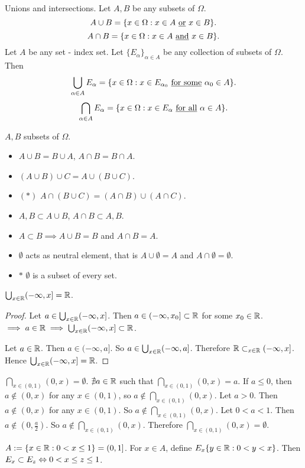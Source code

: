 \documentclass[]{article}
\begin{document}
Unions and intersections. Let $A,B$ be any subsets of $\Omega$.
$$A\cup B = \{ x\in \Omega : x\in A \text{ \underline{or} } x\in B\}.$$
$$A\cap B = \{x\in \Omega : x\in A \text{ \underline{and} } x\in B\}.$$
Let $A$ be any set - index set.
Let $\{E_\alpha\}_{\alpha\in A}$ be any collection of subsets of $\Omega$.
Then $$\bigcup_{\alpha\in A} E_\alpha = \{ x\in \Omega: x\in E_{\alpha_0} \text{ \underline{for some} } \alpha_0\in A\}.$$
$$ \bigcap_{\alpha\in A} E_\alpha = \{x\in \Omega: x\in E_\alpha \text{ \underline{for all} } \alpha\in A\}.$$
\begin{remark}
	$A,B$ subsets of $\Omega$.
	\begin{itemize}
		\item $A\cup B = B\cup A$, $A\cap B = B\cap A$.
		\item $(A\cup B)\cup C = A\cup(B\cup C)$.
		\item $(*)$ $A\cap (B\cup C) = (A\cap B)\cup (A\cap C)$.
		\item $A,B\subset A\cup B$, $A\cap B\subset A,B$.
		\item $A\subset B \implies A\cup B = B$ and $A\cap B = A$.
		\item $\emptyset$ acts as neutral element, that is $A\cup \emptyset = A$ and $A\cap \emptyset = \emptyset$.
		\item $*$ $\emptyset$ is a subset of every set.
	\end{itemize}
\end{remark}
\begin{example}
	$\bigcup_{x\in\mathbb{R}} (-\infty,x] = \mathbb{R}$.
	\begin{proof}
		\say{$\subset$} Let $a\in\bigcup_{x\in\mathbb{R}}(-\infty,x]$.
		Then $a\in(-\infty,x_0]\subset\mathbb{R}$ for some $x_0\in\mathbb{R}$.
		$\implies a\in\mathbb{R}\implies \bigcup_{x\in\mathbb{R}}(-\infty,x]\subset \mathbb{R}$.

		\say{$\supset$} Let $a\in\mathbb{R}$. Then $a\in(-\infty,a]$. So $a\in\bigcup_{x\in\mathbb{R}}(-\infty,a]$. Therefore $\mathbb{R}\subset_{x\in\mathbb{R}} (-\infty,x]$. Hence $\bigcup_{x\in\mathbb{R}} (-\infty,x] = \mathbb{R}$.
	\end{proof}
\end{example}
\begin{example}
	$\bigcap_{x\in(0,1)}(0,x) = \emptyset$. $\nexists a\in\mathbb{R}$ such that $\bigcap_{x\in(0,1)}(0,x) = a$.
	If $a\leq 0$, then $a\notin(0,x)$ for any $x\in(0,1)$, so $a\notin\bigcap_{x\in(0,1)}(0,x)$.
	Let $a>0$. Then $a\notin (0,x)$ for any $x\in(0,1)$. So $a\notin \bigcap_{x\in(0,1)}(0,x)$.
	Let $0<a<1$. Then $a\notin(0,\frac{a}{2})$. So $a\notin \bigcap_{x\in(0,1)}(0,x)$. Therefore $\bigcap_{x\in(0,1)}(0,x) = \emptyset$.
\end{example}
\begin{example}
	[*] $A:=\{x\in\mathbb{R}: 0<x\leq 1\} = (0,1]$. For $x\in A$, define $E_x\{y\in\mathbb{R}: 0<y<x\}$.
	Then $E_x\subset E_z \Leftrightarrow 0<x\leq z \leq 1$.
\end{example}
\end{document}
